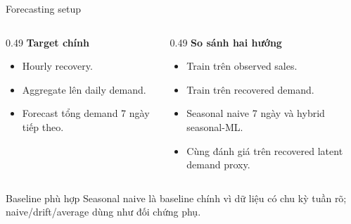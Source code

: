 \documentclass[aspectratio=169,10pt]{beamer}
\begin{document}
\begin{frame}{Forecasting setup}
    \begin{columns}[T]
        \begin{column}{0.49\linewidth}
            \textbf{Target chính}
            \begin{itemize}
                \item Hourly recovery.
                \item Aggregate lên daily demand.
                \item Forecast tổng demand 7 ngày tiếp theo.
            \end{itemize}
        \end{column}
        \begin{column}{0.49\linewidth}
            \textbf{So sánh hai hướng}
            \begin{itemize}
                \item Train trên observed sales.
                \item Train trên recovered demand.
                \item Seasonal naive 7 ngày và hybrid seasonal-ML.
                \item Cùng đánh giá trên recovered latent demand proxy.
            \end{itemize}
        \end{column}
    \end{columns}
    \vspace{0.25cm}
    \begin{block}{Baseline phù hợp}
    Seasonal naive là baseline chính vì dữ liệu có chu kỳ tuần rõ; naive/drift/average dùng như đối chứng phụ.
    \end{block}
\end{frame}
\end{document}
